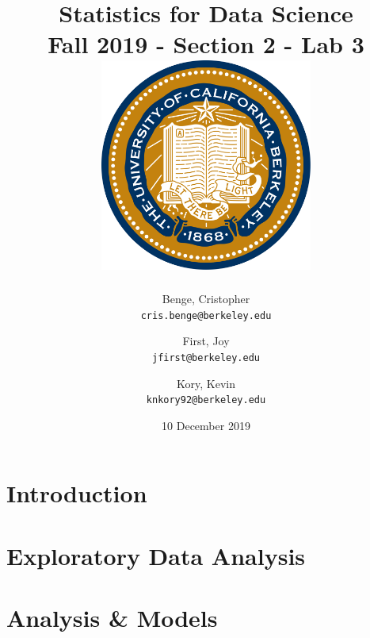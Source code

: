 \documentclass[12pt,a4paper,fleqn]{report}
\date{}
\title{
	{Statistics for Data Science}\\
	{\large Fall 2019 - Section 2 - Lab 3}\\
	{\vspace*{0.5in}}
	{\includegraphics[width=7cm]{UCBerkeley.png}}
}
\author{ 
	Benge, Cristopher\\
	\texttt{cris.benge@berkeley.edu}
	\and
	First, Joy\\
	\texttt{jfirst@berkeley.edu}
	\and
	Kory, Kevin\\
	\texttt{knkory92@berkeley.edu}
}
\date{{\vspace*{1.9in}}\normalsize 10 December 2019}
\numberwithin{equation}{subsection}
\begin{document}


\tableofcontents

\chapter{Introduction}


\chapter{Exploratory Data Analysis}


\chapter{Analysis \& Models}




\end{document}
